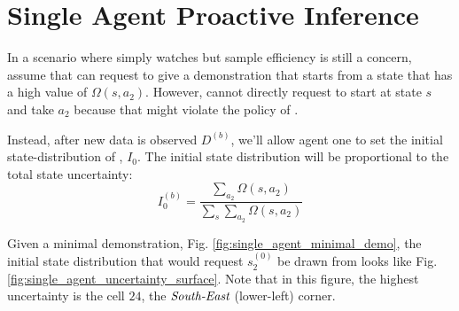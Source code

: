 
\section{Single Agent Proactive Inference}
In a scenario where  simply watches  but sample efficiency is still a concern, assume that  can request  to give a demonstration that starts from a state that has a high value of $\Omega(s,a_2)$. However,  cannot directly request  to start at state $s$ and take $a_2$ because that might violate the policy of .

Instead, after new data is observed $D^{(b)}$, we'll allow agent one to set the initial state-distribution of , $I_0$. The initial state distribution will be proportional to the total state uncertainty:
\begin{equation}\label{eq:active_initial_set}
I_0^{(b)} = \frac{\sum_{a_2} \Omega(s,a_2)}{\sum_s \sum_{a_2} \Omega(s,a_2)}
\end{equation}

\begin{figure}[htb]
	\begin{center}
	\end{center}
\end{figure}
Given a minimal demonstration, Fig. \ref{fig:single_agent_minimal_demo}, the initial state distribution that  would request $s_2^{(0)}$ be drawn from looks like Fig. \ref{fig:single_agent_uncertainty_surface}. Note that in this figure, the highest uncertainty is the cell $24$, the $\emph{South-East}$ (lower-left) corner.

\begin{figure}[htb]
	\begin{center}
	\end{center}
\end{figure}


